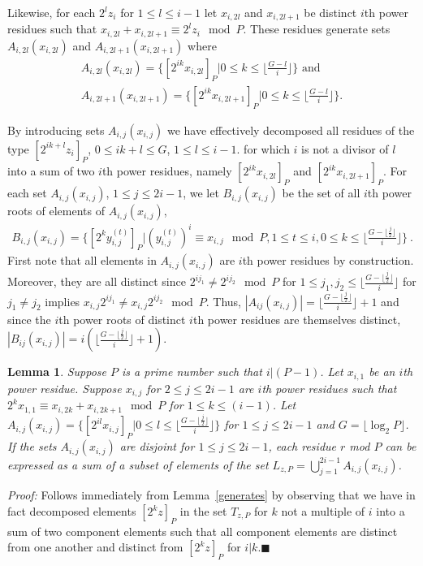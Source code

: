\documentclass[12pt]{article} \pagestyle{plain} \topmargin
\newtheorem{lemma}{Lemma}
\begin{document}
Likewise, for each $2^lz_i$ for $1 \leq l \leq i-1$ let $x_{i,2l}$
and $x_{i,2l+1}$ be distinct $i$th power residues such that
$x_{i,2l} + x_{i,2l+1} \equiv 2^lz_i \mod P$. %
These residues generate sets
$A_{i,2l}(x_{i,2l})$ and  $A_{i,2l+1}(x_{i,2l+1})$ where
\begin{eqnarray}\label{azi2l}
A_{i,2l}(x_{i,2l}) =\{ [2^{ik}x_{i,2l}]_P| 0 \leq k \leq \lfloor
\frac{G-l}{i} \rfloor \} \text{ and }\\
\label{azi2la}A_{i,2l+1}(x_{i,2l+1}) =\{ [2^{ik}x_{i,2l+1}]_P| 0
\leq k \leq \lfloor \frac{G-l}{i} \rfloor \}.\end{eqnarray}

By introducing sets $A_{i,j}(x_{i,j})$ we have effectively
decomposed all residues of the type $[2^{ik+l}z_i]_P$, $0 \leq ik+l
\leq G$, $1 \leq l \leq i-1$. for which $i$ is not a divisor of $l$
into a sum of two $i$th power residues, namely $[2^{ik}x_{i,2l}]_P$
and $[2^{ik}x_{i,2l+1}]_P$. For each set $A_{i,j}(x_{i,j})$, $1 \leq
j \leq 2i-1$, we let $B_{i,j}(x_{i,j})$ be the set of all $i$th
power roots of elements of $A_{i,j}(x_{i,j})$,
\begin{eqnarray}\label{bzi2l}
B_{i,j}(x_{i,j}) =\{ [2^{k}y_{i,j}^{(t)}]_P| (y_{i,j}^{(t)})^i
\equiv x_{i,j} \mod P, 1 \leq t \leq i, 0 \leq k \leq \lfloor
\frac{G-\lfloor \frac{j}{2} \rfloor}{i} \rfloor \}~.
\end{eqnarray}
First note that all elements in $A_{i,j}(x_{i,j})$ are $i$th power
residues by construction. Moreover, they are all distinct since
$2^{ij_1} \neq 2^{ij_2} \mod P$ for $1 \leq j_1,j_2 \leq \lfloor
\frac{G-\lfloor\frac{j}{2} \rfloor}{i} \rfloor$ for $j_1\neq j_2$
implies $x_{i,j}2^{ij_1} \neq x_{i,j}2^{ij_2} \mod P$. Thus,
$|A_{ij}(x_{i,j})|=\lfloor \frac{G-\lfloor \frac{j}{2}\rfloor}{i}
\rfloor+1$ and since the $i$th power roots of distinct $i$th power
residues are themselves distinct,
$|B_{ij}(x_{i,j})|=i\left(\lfloor \frac{G-\lfloor
\frac{j}{2}\rfloor}{i} \rfloor+1\right)$.

\begin{lemma}\label{generates1} Suppose $P$ is a prime number such that $i|(P-1)$.
Let $x_{i,1}$ be an $i$th power residue. Suppose $x_{i,j}$ for $2
\leq j \leq 2i-1$ are $i$th power residues such that $2^{k}x_{1,1}
\equiv x_{i,2k}+x_{i,2k+1} \mod P$ for $1 \leq k \leq(i-1)$. Let
$A_{i,j}(x_{i,j}) =\{[2^{il}x_{i,j}]_P| 0 \leq l \leq \lfloor
\frac{G-\lfloor \frac{j}{2}\rfloor}{i}\rfloor\}$ for $1 \leq j \leq
2i-1$ and $G=\lfloor \log_2P \rfloor$. If the sets
$A_{i,j}(x_{i,j})$ are disjoint for $1 \leq j \leq 2i-1$, each
residue $r$ mod $P$ can be expressed as a sum of a subset of
elements of the set $L_{z,P}= \bigcup_{j=1}^{2i-1}
A_{i,j}(x_{i,j})$.
\end{lemma}
\noindent \textit{Proof:} Follows immediately from
Lemma~\ref{generates} by observing that we have in fact decomposed
elements $[2^{k}z]_P$ in the set $T_{z,P}$ for $k$ not a multiple of
$i$ into a sum of two component elements such that all component
elements are distinct from one another and distinct from $[2^kz]_P$
for $i|k$.\hfill$\blacksquare$
\end{document}
